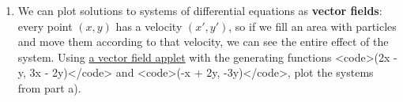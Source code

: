 \documentclass{article}
\begin{document}
\begin{enumerate}

	\item We can plot solutions to systems of differential equations as \textbf{vector fields}: every point $(x, y)$ has a velocity $(x', y')$, so if we fill an area with particles and move them according to that velocity, we can see the entire effect of the system. Using \href{https://cruzgodar.com/applets/vector-fields}{a vector field applet} with the generating functions <code>(2x - y, 3x - 2y)</code> and <code>(-x + 2y, -3y)</code>, plot the systems from part a).

\end{enumerate}
\end{document}
